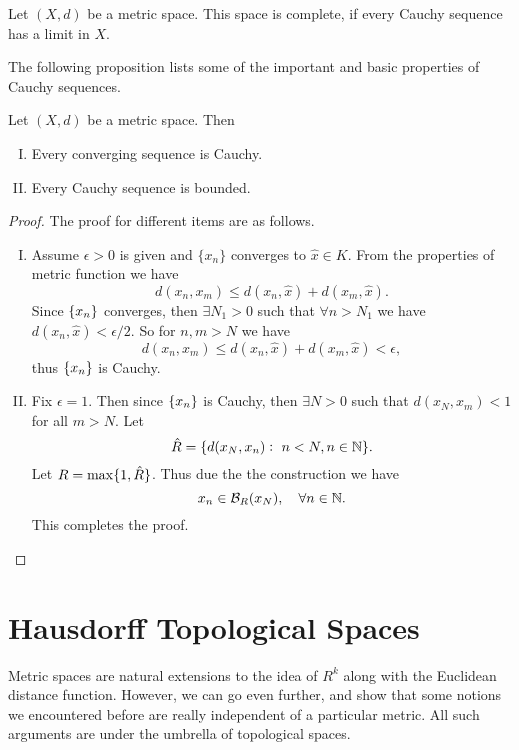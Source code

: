 \begin{definition}
	Let $(X,d)$ be a metric space. This space is complete, if every Cauchy sequence has a limit in $X$.
\end{definition}

The following proposition lists some of the important and basic properties of Cauchy sequences.

\begin{proposition}
	Let $(X,d)$ be a metric space. Then 
	\begin{enumerate}[(I)]
		\item Every converging sequence is Cauchy.
		\item Every Cauchy sequence is bounded.
	\end{enumerate}
\end{proposition}

\begin{proof}
	The proof for different items are as follows.
	\begin{enumerate}[(I)]
		\item Assume $\epsilon>0$ is given and $\{x_n\}$ converges to $\hat{x} \in K$. From the properties of metric function we have
		\[ d(x_n, x_m) \leq d(x_n,\hat{x}) + d(x_m,\hat{x}). \]
		Since $\{x_n\}$ converges, then $\exists N_1 > 0$ such that $\forall n > N_1$ we have $d(x_n,\hat{x}) < \epsilon/2$. So for $n,m > N$ we have
		\[  d(x_n, x_m) \leq d(x_n,\hat{x}) + d(x_m,\hat{x}) < \epsilon,\]
		thus $\{x_n\}$ is Cauchy.
		
		\item Fix $\epsilon=1$. Then since $\{x_n\}$ is Cauchy, then $\exists N > 0$ such that $d(x_N, x_m) < 1 $ for all $m > N$. Let
		\[ \hat{R} = \{ d(x_N, x_n):\ n < N, n \in \mathbb{N} \}. \]
		Let $ R = \max\{1,\hat{R}\}$. Thus due the the construction we have
		\[ x_n \in \mathcal{B}_{R}(x_N), \quad \forall n \in \mathbb{N}. \]
		This completes the proof.

	\end{enumerate}
\end{proof}


\section{Hausdorff Topological Spaces}
Metric spaces are natural extensions to the idea of $R^k$ along with the Euclidean distance function. However, we can go even further, and show that some notions we encountered before are really independent of a particular metric. All such arguments are under the umbrella of topological spaces. 


